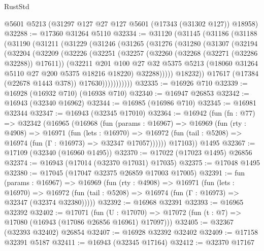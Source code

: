 \begin{lexlean}{RustStd}
\begin{coremodule}
    @5601
    @5213
    (@31297 @127 @27 @127 @5601 (@17343 (@31302 @127)) @18958)
@32288 := @17360 @31264 @5110
@32334 := @31120
    (@31145
      (@31186
        (@31188
          (@31190
            (@31211
              (@31229
                (@31246
                  (@31265
                    (@31276
                      (@31280
                        (@31307
                          (@32194
                            (@32204
                              (@32209
                                (@32226
                                  (@32251
                                    (@32257
                                      (@32260 (@32268 (@32271 (@32286 @32288)) @17611))
                                      (@32211
                                        @201
                                        @100
                                        @27
                                        @32
                                        @5375
                                        @5213
                                        (@18060 @31264 @5110 @27 @200 @5375 @18216 @18220)
                                        @32288)))))
                              @18232))
                          @17617
                          (@17384 (@22678 @1443 @378))
                          @17630)))))))))))
@32335 := @16926 @710
@32339 := @16928 (@16932 @710) (@16938 @710)
@32340 := @16947 @26853
@32342 := @16943 (@32340 @16962)
@32344 := @16985 (@16986 @710)
@32345 := @16981 @32344
@32347 := @16943 (@32345 @17010)
@32364 := @16942
    (fun (fn : @77) =>
    @32342
      (@16965
        (@16968
          (fun (params : @16967) =>
          @16969
            (fun (rty : @4908) =>
            @16971
              (fun (lets : @16970) =>
              @16972 (fun (tail : @5208) => @16974 (fun (Γ : @16973) => @32347 @17057))))))
        @17103))
    @1495
@32367 := @17109 (@32340 (@16960 @1495))
@32370 := @17022 (@17023 @1495) @26856
@32374 := @16943 (@17014 (@32370 @17031) @17035)
@32375 := @17048 @1495
@32380 := @17045 (@17047 @32375 @26859 @17003 @17005)
@32391 := fun (params : @16967) =>
  @16969
    (fun (rty : @4908) =>
    @16971
      (fun (lets : @16970) =>
      @16972 (fun (tail : @5208) => @16974 (fun (Γ : @16973) => @32347 (@32374 @32380)))))
@32392 := @16968 @32391
@32393 := @16965 @32392
@32402 := @17071
    (fun (U : @17070) => @17072 (fun (t : @7) => @17080 (@16943 (@17086 @26856 @16961) @17097)))
@32405 := @32367 (@32393 @32402) @26854
@32407 := @16928 @32392 @32402
@32409 := @17158 @32391 @5187
@32411 := @16943 (@32345 @17164)
@32412 := @32370 @17167

\end{coremodule}
\end{lexlean}
